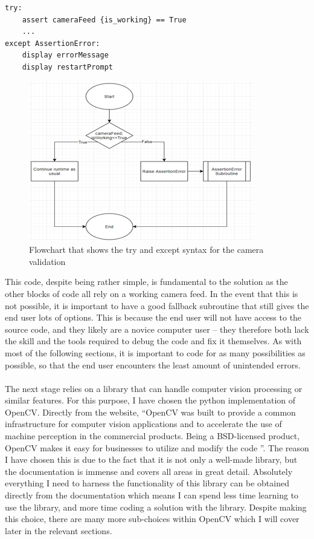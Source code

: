 \documentclass[9pt]{article}
\begin{document}
\begin{lstlisting}
try:
	assert cameraFeed {is_working} == True
	...
except AssertionError:
	display errorMessage
	display restartPrompt
\end{lstlisting}
\begin{figure}[H]
	\centering
	\includegraphics{flowCameraworking.png}
	\caption{Flowchart that shows the try and except syntax for the camera validation}\label{fig_cameraWorking}
\end{figure}
This code, despite being rather simple, is fundamental to the solution as the other blocks of code all rely on a working camera feed. In the event that this is not possible, it is important to have a good fallback subroutine that still gives the end user lots of options. This is because the end user will not have access to the source code, and they likely are a novice computer user – they therefore both lack the skill and the tools required to debug the code and fix it themselves. As with most of the following sections, it is important to code for as many possibilities as possible, so that the end user encounters the least amount of unintended errors.\\\\
The next stage relies on a library that can handle computer vision processing or similar features. For this purpose, I have chosen the python implementation of OpenCV. 
Directly from the website, ``OpenCV was built to provide a common infrastructure for computer vision applications and to accelerate the use of machine perception in the commercial products. Being a BSD-licensed product, OpenCV makes it easy for businesses to utilize and modify the code \cite{openCvAbout}”. The reason I have chosen this is due to the fact that it is not only a well-made library, but the documentation is immense and covers all areas in great detail. Absolutely everything I need to harness the functionality of this library can be obtained directly from the documentation which means I can spend less time learning to use the library, and more time coding a solution with the library. Despite making this choice, there are many more sub-choices within OpenCV which I will cover later in the relevant sections.
\end{document}
